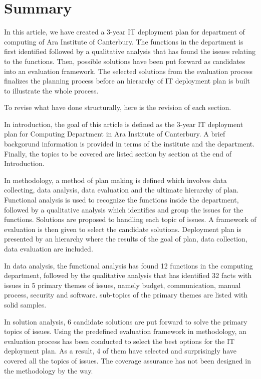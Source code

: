 
\section{Summary}

In this article, we have created a 3-year IT deployment plan for department of computing of Ara Institute of Canterbury. The functions in the department is first identified followed by a qualitative analysis that has found the issues relating to the functions. Then, possible solutions have been put forward as candidates into an evaluation framework. The selected solutions from the evaluation process finalizes the planning process before an hierarchy of IT deployment plan is built to illustrate the whole process.

To revise what have done structurally, here is the revision of each section.

In introduction, the goal of this article is defined as the 3-year IT deployment plan for Computing Department in Ara Institute of Canterbury. A brief backgorund information is provided in terms of the institute and the department. Finally, the topics to be covered are listed section by section at the end of Introduction.

In methodology, a method of plan making is defined which involves data collecting, data analysis, data evaluation and the ultimate hierarchy of plan. Functional analysis is used to recognize the functions inside the department, followed by a qualitative analysis which identifies and group the issues for the functions. Solutions are proposed to handling each topic of issues. A framework of evaluation is then given to select the candidate solutions. Deployment plan is presented by an hierarchy where the results of the goal of plan, data collection, data evaluation are included.

In data analysis, the functional analysis has found 12 functions in the computing department, followed by the qualitative analysis that has identified 32 facts with issues in 5 primary themes of issues, namely budget, communication, manual process, security and software. sub-topics of the primary themes are listed with solid samples.

In solution analysis, 6 candidate solutions are put forward to solve the primary topics of issues. Using the predefined evaluation framework in methodology, an evaluation process has been conducted to select the best options for the IT deployment plan. As a result, 4 of them have selected and surprisingly have covered all the topics of issues. The coverage assurance has not been designed in the methodology by the way.

